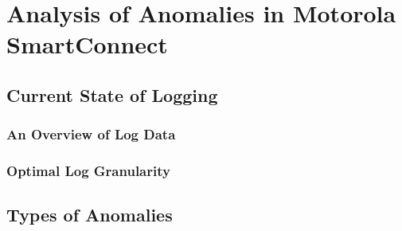 \chapter{Analysis of Anomalies in Motorola SmartConnect}
\section{Current State of Logging}
\subsection{An Overview of Log Data}
\subsection{Optimal Log Granularity}
\section{Types of Anomalies}


